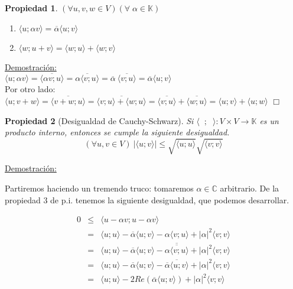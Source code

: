 \documentclass[12pt]{book}
\newtheorem{prop}{Propiedad}
\def\C{\mathbb{C}}
\def\K{\mathbb{K}}
\begin{document}
{\begin{prop}
$(\forall u,v,w\in V)(\forall\;\alpha\in \K)$
\begin{enumerate}
\item $\langle  u ; \alpha v\rangle=\overline{\alpha} \langle u; v\rangle$
\item $\langle w;u+v\rangle= \langle w;u\rangle+\langle w;v\rangle$
\end{enumerate}
\end{prop}

\underline{Demostraci\'on:}\\

$\langle  u ; \alpha v\rangle=\overline{\langle \alpha v; u\rangle}=\overline{\alpha\langle v; u\rangle}=\overline{\alpha}\ \overline{\langle v; u\rangle}=\overline{\alpha}\langle u; v\rangle$\\

Por otro lado:\\

$\langle  u ; v+w\rangle=\overline{\langle v+w; u\rangle}=\overline{\langle v;u\rangle+\langle w; u\rangle}=\overline{\langle v;u\rangle}+ \overline{\langle w; u\rangle}=\langle u;v\rangle+\langle u; w\rangle$
\hfill$\Box$
 


\begin{prop}[Desigualdad de Cauchy-Schwarz]
Si $\langle \phantom{x};\phantom{x} \rangle:V\times V\rightarrow \K$ es un producto interno, entonces se cumple la siguiente desigualdad.
$$ (\forall u,v\in V)\ |\langle u; v\rangle |\le \sqrt{\langle u; u\rangle} \sqrt{\langle v; v\rangle} $$
\end{prop}

\underline{Demostraci\'on:}

 Partiremos haciendo un tremendo truco: tomaremos $\alpha\in\C$ arbitrario. De la propiedad 3 de p.i. tenemos la siguiente desigualdad, que podemos desarrollar.
 
  \begin{eqnarray*}
    0&\le&\langle u-\alpha v;u-\alpha v\rangle\\
    &=&\langle u;u\rangle-\overline{\alpha}\langle u;v\rangle-\alpha\langle v;u\rangle+|\alpha|^2\langle v;v\rangle\\
    &=&\langle u;u\rangle-\overline{\alpha}\langle u;v\rangle-\overline{\overline{\alpha\langle v;u\rangle}}+|\alpha|^2\langle v;v\rangle\\
    &=&\langle u;u\rangle-\overline{\alpha}\langle u;v\rangle-\overline{\overline{\alpha}\langle u;v\rangle}+|\alpha|^2\langle v;v\rangle\\
    &=&\langle u;u\rangle-2Re(\overline{\alpha}\langle u;v\rangle)+|\alpha|^2\langle v;v\rangle
  \end{eqnarray*}
  
}
\end{document}
